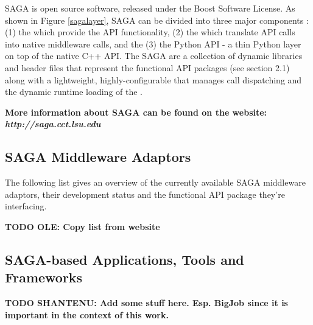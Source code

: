     SAGA is open source software, released under the Boost Software
    License. As shown in Figure \ref{sagalayer}, SAGA can be divided
    into three major components : (1) the  which
    provide the API functionality, (2) the  which translate
    API calls into native middleware calls, and the (3) the Python API
     - a thin Python layer on top of the native C++
    API. The SAGA  are a collection of dynamic
    libraries and header files that represent the functional API
    packages (see section 2.1) along with a lightweight,
    highly-configurable  that manages call dispatching and
    the dynamic runtime loading of the .

    \textbf{More information about SAGA can be found on the
    website: \\ \textit{http://saga.cct.lsu.edu}}

\subsection{SAGA Middleware Adaptors}

    The following list gives an overview of the currently available SAGA
    middleware adaptors, their development status and the functional API
    package they're interfacing.
    
    \textbf{TODO OLE: Copy list from website}
    
    
\subsection{SAGA-based Applications, Tools and Frameworks}
    
    \textbf{TODO SHANTENU: Add some stuff here. Esp. BigJob since it is important
    in the context of this work.} 
	
